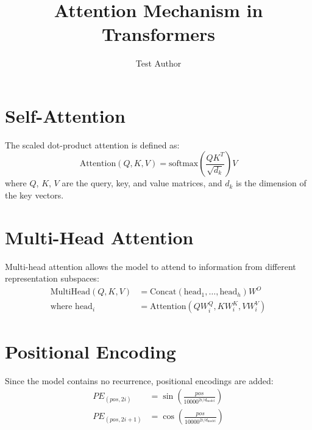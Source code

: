 \documentclass{article}
\title{Attention Mechanism in Transformers}
\author{Test Author}
\date{}
\begin{document}
\maketitle

\section{Self-Attention}
The scaled dot-product attention is defined as:
\begin{equation}
\text{Attention}(Q, K, V) = \text{softmax}\left(\frac{QK^T}{\sqrt{d_k}}\right)V
\end{equation}
where $Q$, $K$, $V$ are the query, key, and value matrices, and $d_k$ is the dimension of the key vectors.

\section{Multi-Head Attention}
Multi-head attention allows the model to attend to information from different representation subspaces:
\begin{align}
\text{MultiHead}(Q, K, V) &= \text{Concat}(\text{head}_1, \ldots, \text{head}_h)W^O \\
\text{where head}_i &= \text{Attention}(QW_i^Q, KW_i^K, VW_i^V)
\end{align}

\section{Positional Encoding}
Since the model contains no recurrence, positional encodings are added:
\begin{align}
PE_{(pos, 2i)} &= \sin\left(\frac{pos}{10000^{2i/d_{\text{model}}}}\right) \\
PE_{(pos, 2i+1)} &= \cos\left(\frac{pos}{10000^{2i/d_{\text{model}}}}\right)
\end{align}
\end{document}
